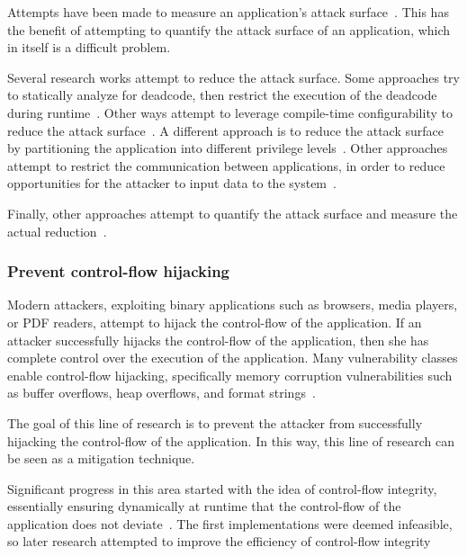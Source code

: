 \documentclass[11pt,letterpaper]{article}
\begin{document}
Attempts have been made to measure an application's attack
surface~\cite{Howard2003, Manadhata2007, Manadhata2008, Ruprecht2014}.
This has the benefit of attempting to quantify the attack surface of
an application, which in itself is a difficult problem.

Several research works attempt to reduce the attack surface. Some
approaches try to statically analyze for deadcode, then restrict the
execution of the deadcode during runtime~\cite{Kurmus2011}. Other ways
attempt to leverage compile-time configurability to reduce the attack
surface~\cite{Tartler2012, Kurmus2013, Ruprecht2014}. A different
approach is to reduce the attack surface by partitioning the
application into different privilege levels~\cite{Barth2010, Xu2012}.
Other approaches attempt to restrict the communication between
applications, in order to reduce opportunities for the attacker to
input data to the system~\cite{Kantola2012}.

Finally, other approaches attempt to quantify the attack surface and
measure the actual reduction~\cite{Kurmus2014}.

\subsubsection{Prevent control-flow hijacking}

Modern attackers, exploiting binary applications such as browsers,
media players, or PDF readers, attempt to hijack the control-flow of
the application. If an attacker successfully hijacks the control-flow
of the application, then she has complete control over the execution
of the application. Many vulnerability classes enable control-flow
hijacking, specifically memory corruption vulnerabilities such as
buffer overflows, heap overflows, and format strings~\cite{Szekeres2013}.

The goal of this line of research is to prevent the attacker from
successfully hijacking the control-flow of the application. In this
way, this line of research can be seen as a mitigation technique.

Significant progress in this area started with the idea of
control-flow integrity, essentially ensuring dynamically at runtime
that the control-flow of the application does not
deviate~\cite{Abadi2005, Abadi2009}. The first implementations were
deemed infeasible, so later research attempted to improve the
efficiency of control-flow integrity~\cite{Zhang2013, Tice2014,
  Bletsch2011, Zhang2013, Zhang2013a}
\end{document}
